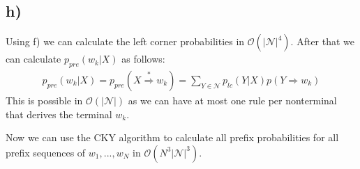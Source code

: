\documentclass[a4paper,12pt]{ETHexercise}
\begin{document}
\subsection*{h)}
Using f) we can calculate the left corner probabilities in $\mathcal{O}(|\mathcal{N}|^4)$. After that we can calculate $p_{pre}(w_k|X)$ as follows:
\begin{align}
    p_{pre}(w_k|X) = p_{pre}(X \stackrel{*}{\Rightarrow} w_k) = \sum_{Y \in \mathcal{N}}p_{lc}(Y|X)p(Y \Rightarrow w_k)
\end{align}
This is possible in $\mathcal{O}(|\mathcal{N}|)$ as we can have at most one rule per nonterminal that derives the terminal $w_k$.

Now we can use the CKY algorithm to calculate all prefix probabilities for all prefix sequences of $w_1,...,w_N$ in $\mathcal{O}(N^3|\mathcal{N}|^3)$.
\end{document}
